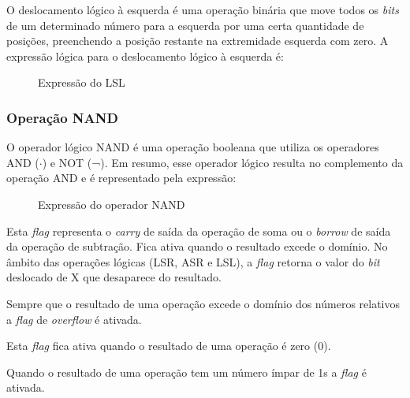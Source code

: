 
O deslocamento lógico à esquerda é uma operação binária que move todos os \textit{bits} de um determinado número para a esquerda por uma certa quantidade de posições, preenchendo a posição restante na extremidade esquerda com zero. A expressão lógica para o deslocamento lógico à esquerda é:

\begin{figure}[H]
    \centering
    \caption{Expressão do LSL}
\end{figure}

\subsubsection{Operação NAND}

O operador lógico NAND é uma operação booleana que utiliza os operadores AND ($\cdot$) e NOT (¬). Em resumo, esse operador lógico resulta no complemento da operação AND e é representado pela expressão:

\begin{figure}[H] \centering {} \caption{Expressão do operador NAND} \end{figure}
\newpage



Esta \textit{flag} representa o \textit{carry} de saída da operação de soma ou o \textit{borrow} de saída da operação de subtração. Fica ativa quando o resultado excede o domínio. No âmbito das operações lógicas (LSR, ASR e LSL), a \textit{flag} retorna o valor do \textit{bit} deslocado de X que desaparece do resultado.


Sempre que o resultado de uma operação excede o domínio dos números relativos a \textit{flag} de \textit{overflow} é ativada.


Esta \textit{flag} fica ativa quando o resultado de uma operação é zero (0).


Quando o resultado de uma operação tem um número ímpar de 1s a \textit{flag} é ativada.


